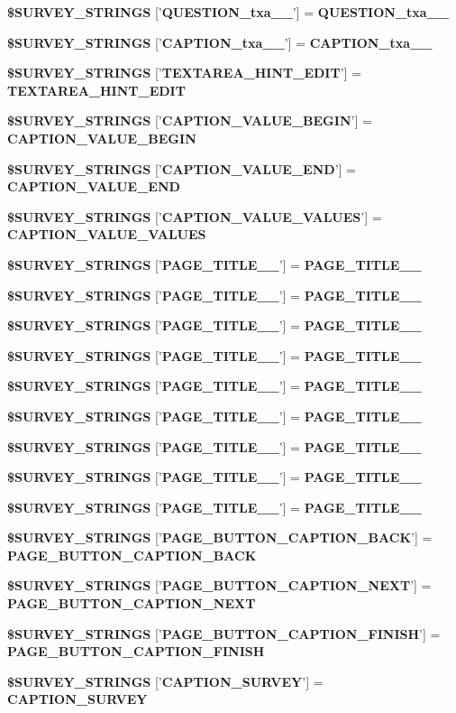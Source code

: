 \begin{CompactItemize}
\item 
{\bf \$SURVEY\_\-STRINGS} ['{\bf QUESTION\_\-txa\_\_\-}'] = {\bf QUESTION\_\-txa\_\_\-}
\item 
{\bf \$SURVEY\_\-STRINGS} ['{\bf CAPTION\_\-txa\_\_\-}'] = {\bf CAPTION\_\-txa\_\_\-}
\item 
{\bf \$SURVEY\_\-STRINGS} ['{\bf TEXTAREA\_\-HINT\_\-EDIT}'] = {\bf TEXTAREA\_\-HINT\_\-EDIT}
\item 
{\bf \$SURVEY\_\-STRINGS} ['{\bf CAPTION\_\-VALUE\_\-BEGIN}'] = {\bf CAPTION\_\-VALUE\_\-BEGIN}
\item 
{\bf \$SURVEY\_\-STRINGS} ['{\bf CAPTION\_\-VALUE\_\-END}'] = {\bf CAPTION\_\-VALUE\_\-END}
\item 
{\bf \$SURVEY\_\-STRINGS} ['{\bf CAPTION\_\-VALUE\_\-VALUES}'] = {\bf CAPTION\_\-VALUE\_\-VALUES}
\item 
{\bf \$SURVEY\_\-STRINGS} ['{\bf PAGE\_\-TITLE\_\_\-}'] = {\bf PAGE\_\-TITLE\_\_\-}
\item 
{\bf \$SURVEY\_\-STRINGS} ['{\bf PAGE\_\-TITLE\_\_\-}'] = {\bf PAGE\_\-TITLE\_\_\-}
\item 
{\bf \$SURVEY\_\-STRINGS} ['{\bf PAGE\_\-TITLE\_\_\-}'] = {\bf PAGE\_\-TITLE\_\_\-}
\item 
{\bf \$SURVEY\_\-STRINGS} ['{\bf PAGE\_\-TITLE\_\_\-}'] = {\bf PAGE\_\-TITLE\_\_\-}
\item 
{\bf \$SURVEY\_\-STRINGS} ['{\bf PAGE\_\-TITLE\_\_\-}'] = {\bf PAGE\_\-TITLE\_\_\-}
\item 
{\bf \$SURVEY\_\-STRINGS} ['{\bf PAGE\_\-TITLE\_\_\-}'] = {\bf PAGE\_\-TITLE\_\_\-}
\item 
{\bf \$SURVEY\_\-STRINGS} ['{\bf PAGE\_\-TITLE\_\_\-}'] = {\bf PAGE\_\-TITLE\_\_\-}
\item 
{\bf \$SURVEY\_\-STRINGS} ['{\bf PAGE\_\-TITLE\_\_\-}'] = {\bf PAGE\_\-TITLE\_\_\-}
\item 
{\bf \$SURVEY\_\-STRINGS} ['{\bf PAGE\_\-TITLE\_\_\-}'] = {\bf PAGE\_\-TITLE\_\_\-}
\item 
{\bf \$SURVEY\_\-STRINGS} ['{\bf PAGE\_\-BUTTON\_\-CAPTION\_\-BACK}'] = {\bf PAGE\_\-BUTTON\_\-CAPTION\_\-BACK}
\item 
{\bf \$SURVEY\_\-STRINGS} ['{\bf PAGE\_\-BUTTON\_\-CAPTION\_\-NEXT}'] = {\bf PAGE\_\-BUTTON\_\-CAPTION\_\-NEXT}
\item 
{\bf \$SURVEY\_\-STRINGS} ['{\bf PAGE\_\-BUTTON\_\-CAPTION\_\-FINISH}'] = {\bf PAGE\_\-BUTTON\_\-CAPTION\_\-FINISH}
\item 
{\bf \$SURVEY\_\-STRINGS} ['{\bf CAPTION\_\-SURVEY}'] = {\bf CAPTION\_\-SURVEY}
\end{CompactItemize}


